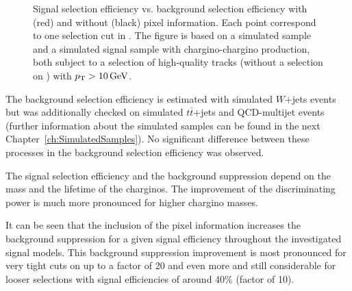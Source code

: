\begin{figure}[!t]
\begin{tabular}{c}
  \end{tabular}
  \caption{Signal selection efficiency vs. background selection efficiency with (red) and without (black) pixel information.
           Each point correspond to one selection cut in \ias.
           The figure is based on a simulated \WJets sample and a simulated signal sample with chargino-chargino production, both subject to a selection of high-quality tracks (without a selection on \nhits) with $p_{\text{T}}>10\,\text{Ge}\kern-0.06667em\text{V}$.}
  \vspace{40pt}
  \label{fig:ROCplots}
\end{figure} 
The background selection efficiency is estimated with simulated $W$+jets  events but was additionally checked on simulated $t\bar{t}$+jets  and QCD-multijet events 
(further information about the simulated samples can be found in the next Chapter~\ref{ch:SimulatedSamples}).
No significant difference between these processes in the background selection efficiency was observed.

The signal selection efficiency and the background suppression depend on the mass and the lifetime of the charginos.
The improvement of the discriminating power is much more pronounced for higher chargino masses.

It can be seen that the inclusion of the pixel information increases the background suppression for a given signal efficiency throughout the investigated signal models.
This background suppression improvement is most pronounced for very tight cuts on \ias up to a factor of 20 and even more and still considerable for looser selections with signal efficiencies of around 40\% (factor of 10).
